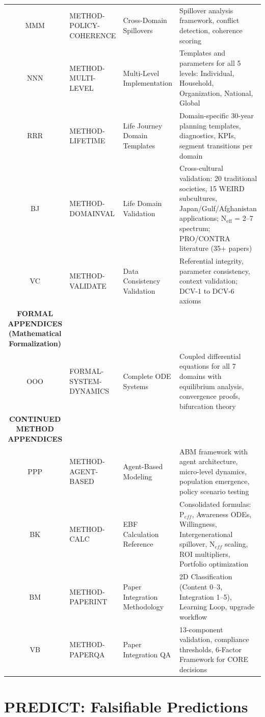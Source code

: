 \begin{table}[htbp]
\begin{tabular}{@{}cllp{5cm}@{}}
MMM & METHOD-POLICY-COHERENCE & Cross-Domain Spillovers & Spillover analysis framework, conflict detection, coherence scoring \\
NNN & METHOD-MULTI-LEVEL & Multi-Level Implementation & Templates and parameters for all 5 levels: Individual, Household, Organization, National, Global \\
RRR & METHOD-LIFETIME & Life Journey Domain Templates & Domain-specific 30-year planning templates, diagnostics, KPIs, segment transitions per domain \\
BJ & METHOD-DOMAINVAL & Life Domain Validation & Cross-cultural validation: 20 traditional societies, 15 WEIRD subcultures, Japan/Gulf/Afghanistan applications; N$_{\text{eff}}$ = 2--7 spectrum; PRO/CONTRA literature (35+ papers) \\
VC & METHOD-VALIDATE & Data Consistency Validation & Referential integrity, parameter consistency, context validation; DCV-1 to DCV-6 axioms \\
\midrule
\textbf{FORMAL APPENDICES (Mathematical Formalization)} \\
\midrule
OOO & FORMAL-SYSTEM-DYNAMICS & Complete ODE Systems & Coupled differential equations for all 7 domains with equilibrium analysis, convergence proofs, bifurcation theory \\
\midrule
\textbf{CONTINUED METHOD APPENDICES} \\
\midrule
PPP & METHOD-AGENT-BASED & Agent-Based Modeling & ABM framework with agent architecture, micro-level dynamics, population emergence, policy scenario testing \\
BK & METHOD-CALC & EBF Calculation Reference & Consolidated formulas: P$_{eff}$, Awareness ODEs, Willingness, Intergenerational spillover, N$_{eff}$ scaling, ROI multipliers, Portfolio optimization \\
BM & METHOD-PAPERINT & Paper Integration Methodology & 2D Classification (Content 0--3, Integration 1--5), Learning Loop, upgrade workflow \\
VB & METHOD-PAPERQA & Paper Integration QA & 13-component validation, compliance thresholds, 6-Factor Framework for CORE decisions \\
\bottomrule
\end{tabular}
\end{table}

\section{PREDICT: Falsifiable Predictions}
\label{sec:index-predict}

